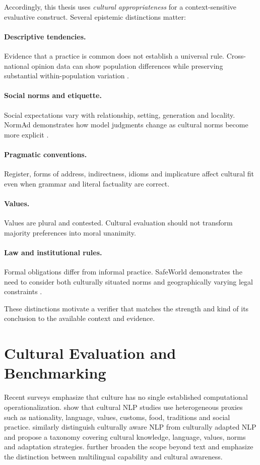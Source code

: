 Accordingly, this thesis uses \emph{cultural appropriateness} for a context-sensitive evaluative construct. Several epistemic distinctions matter:

\paragraph{Descriptive tendencies.} Evidence that a practice is common does not establish a universal rule. Cross-national opinion data can show population differences while preserving substantial within-population variation \parencite{durmus2023globalopinionqa,tao2024culturalbias}.

\paragraph{Social norms and etiquette.} Social expectations vary with relationship, setting, generation and locality. NormAd demonstrates how model judgments change as cultural norms become more explicit \parencite{rao2025normad}.

\paragraph{Pragmatic conventions.} Register, forms of address, indirectness, idioms and implicature affect cultural fit even when grammar and literal factuality are correct.

\paragraph{Values.} Values are plural and contested. Cultural evaluation should not transform majority preferences into moral unanimity.

\paragraph{Law and institutional rules.} Formal obligations differ from informal practice. SafeWorld demonstrates the need to consider both culturally situated norms and geographically varying legal constraints \parencite{yin2024safeworld}.

These distinctions motivate a verifier that matches the strength and kind of its conclusion to the available context and evidence.

\section{Cultural Evaluation and Benchmarking}
Recent surveys emphasize that culture has no single established computational operationalization. \textcite{adilazuarda2024culture} show that cultural NLP studies use heterogeneous proxies such as nationality, language, values, customs, food, traditions and social practice. \textcite{liu2025culturallyaware} similarly distinguish culturally aware NLP from culturally adapted NLP and propose a taxonomy covering cultural knowledge, language, values, norms and adaptation strategies. \textcite{pawar2025culturalawareness} further broaden the scope beyond text and emphasize the distinction between multilingual capability and cultural awareness.

